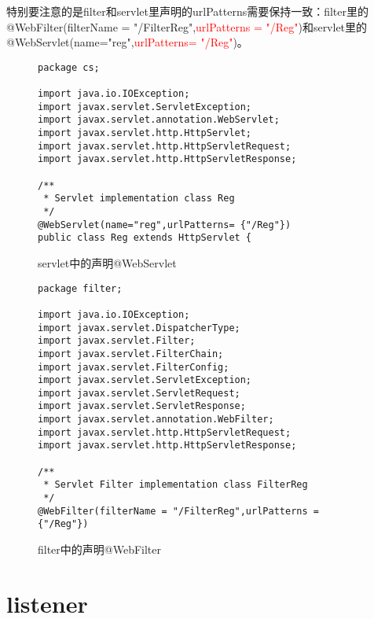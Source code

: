 \documentclass[a4paper]{book}
\begin{document}
特别要注意的是filter和servlet里声明的urlPatterns需要保持一致：filter里的@WebFilter(filterName = "/FilterReg",\textcolor{red}{urlPatterns = {"/Reg"}})和servlet里的@WebServlet(name="reg",\textcolor{red}{urlPatterns= {"/Reg"}})。
\begin{figure}
\begin{lstlisting}
package cs;

import java.io.IOException;
import javax.servlet.ServletException;
import javax.servlet.annotation.WebServlet;
import javax.servlet.http.HttpServlet;
import javax.servlet.http.HttpServletRequest;
import javax.servlet.http.HttpServletResponse;

/**
 * Servlet implementation class Reg
 */
@WebServlet(name="reg",urlPatterns= {"/Reg"})
public class Reg extends HttpServlet {
\end{lstlisting}
\caption{servlet中的声明@WebServlet}
\label{webServlet}
\end{figure}
\begin{figure}
\begin{lstlisting}
package filter;

import java.io.IOException;
import javax.servlet.DispatcherType;
import javax.servlet.Filter;
import javax.servlet.FilterChain;
import javax.servlet.FilterConfig;
import javax.servlet.ServletException;
import javax.servlet.ServletRequest;
import javax.servlet.ServletResponse;
import javax.servlet.annotation.WebFilter;
import javax.servlet.http.HttpServletRequest;
import javax.servlet.http.HttpServletResponse;

/**
 * Servlet Filter implementation class FilterReg
 */
@WebFilter(filterName = "/FilterReg",urlPatterns = {"/Reg"})
\end{lstlisting}
\caption{filter中的声明@WebFilter}
\label{webFilter}
\end{figure}

\section{listener}
\end{document}
